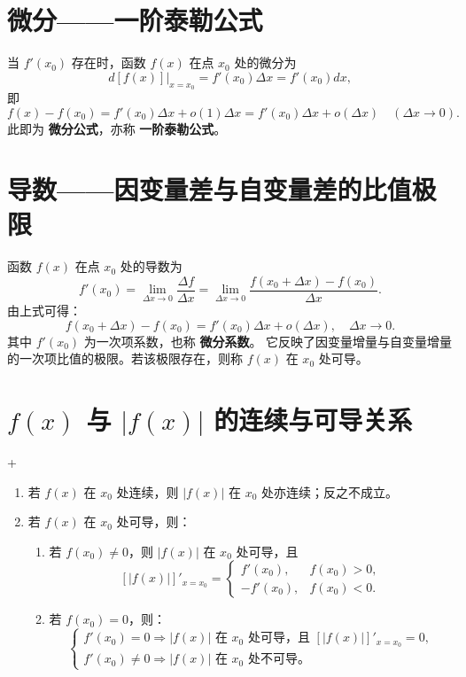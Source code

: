 
\section{微分——一阶泰勒公式}
\DTwo

当 $f'(x_0)$ 存在时，函数 $f(x)$ 在点 $x_0$ 处的微分为
\[
    d[f(x)]\big|_{x=x_0} = f'(x_0)\Delta x = f'(x_0)dx,
\]
即
\[
    f(x) - f(x_0) = f'(x_0)\Delta x + o(1)\Delta x = f'(x_0)\Delta x + o(\Delta x) \quad (\Delta x \to 0).
\]
此即为 \textbf{微分公式}，亦称 \textbf{一阶泰勒公式}。

\section{导数——因变量差与自变量差的比值极限}
\DTwoTwo

函数 $f(x)$ 在点 $x_0$ 处的导数为
\[
    f'(x_0) = \lim_{\Delta x \to 0} \frac{\Delta f}{\Delta x}
    = \lim_{\Delta x \to 0} \frac{f(x_0 + \Delta x) - f(x_0)}{\Delta x}.
\]
由上式可得：
\[
    f(x_0 + \Delta x) - f(x_0)
    = f'(x_0)\Delta x + o(\Delta x), \quad \Delta x \to 0.
\]
其中 $f'(x_0)$ 为一次项系数，也称 \textbf{微分系数}。
它反映了因变量增量与自变量增量的一次项比值的极限。若该极限存在，则称 $f(x)$ 在 $x_0$ 处可导。

\section{$f(x)$ 与 $|f(x)|$ 的连续与可导关系}
\DTwoOne+\DFourThree

\begin{enumerate}
    \item 若 $f(x)$ 在 $x_0$ 处连续，则 $|f(x)|$ 在 $x_0$ 处亦连续；反之不成立。
    \item 若 $f(x)$ 在 $x_0$ 处可导，则：
          \begin{enumerate}
              \item 若 $f(x_0) \neq 0$，则 $|f(x)|$ 在 $x_0$ 处可导，且
                    \[
                        [|f(x)|]'_{x=x_0} =
                        \begin{cases}
                            f'(x_0),  & f(x_0) > 0, \\
                            -f'(x_0), & f(x_0) < 0.
                        \end{cases}
                    \]
              \item 若 $f(x_0) = 0$，则：
                    \[
                        \begin{cases}
                            f'(x_0) = 0 \Rightarrow |f(x)| \text{ 在 } x_0 \text{ 处可导，且 } [|f(x)|]'_{x=x_0}=0, \\[5pt]
                            f'(x_0) \ne 0 \Rightarrow |f(x)| \text{ 在 } x_0 \text{ 处不可导。}
                        \end{cases}
                    \]
          \end{enumerate}
\end{enumerate}

